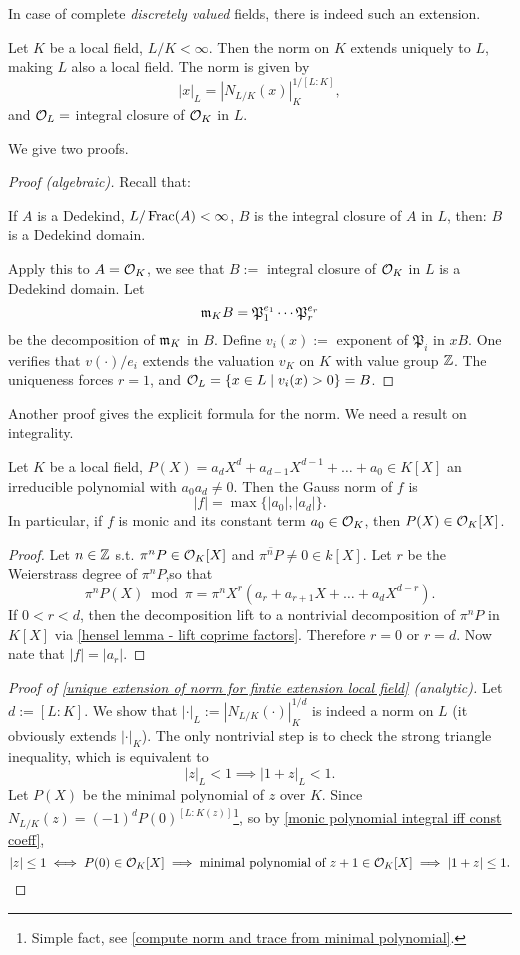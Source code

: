 In case of complete \textit{discretely valued} fields, there is indeed such an extension.
\begin{theorem}\label{unique extension of norm for fintie extension local field}
    Let $K$ be a local field, $L/K < \infty$.
    Then the norm on $K$ extends uniquely to $L$, making $L$ also a local field.
    The norm is given by \[|x|_L = \left|N_{L/K}(x)\right|_K^{1/[L : K]},\]
    and $\mathcal{O}_L = $ integral closure of $\mathcal{O}_K$ in $L$. 
\end{theorem}
We give two proofs.
\begin{proof}
    [Proof (algebraic)]Recall that:
\begin{lemma}\label{extension of Dedekind: integral closure of Dedekind domain in finite extension of its fraction field is Dedekind domain}
    If $A$ is a Dedekind, $L/\operatorname{Frac}(A) < \infty$, $B$ is the integral closure of $A$ in $L$, then: $B$ is a Dedekind domain.
\end{lemma}
Apply this to $A = \mathcal{O}_K$,
we see that $B :=$ integral closure of $\mathcal{O}_K$ in $L$ is a Dedekind domain.
Let \[\mathfrak{m}_KB = \mathfrak{P}_1^{e_1}\cdots\mathfrak{P}_r^{e_r}\] be the decomposition of $\mathfrak{m}_K$ in $B$. Define $v_i(x) := $ exponent of $\mathfrak{P}_i$ in $xB$.
One verifies that $v(\cdot)/e_i$ extends the valuation $v_K$ on $K$ with value group $\mathbb{Z}$.
The uniqueness forces $r = 1$, and $\mathcal{O}_L = \{x\in L\mid v_i(x) > 0\} = B$.
\end{proof}
Another proof gives the explicit formula for the norm. We need a result on integrality.
\begin{proposition}
    Let $K$ be a local field, $P(X) = a_dX^d + a_{d-1}X^{d-1} + \dots + a_0\in K[X]$ an irreducible polynomial with $a_0a_d\ne 0$.
    Then the Gauss norm of $f$ is
    \[|f| = \max\{|a_0|, |a_d|\}.\]
    In particular, if $f$ is monic and its constant term $a_0\in\mathcal{O}_K$, then $P(X)\in\mathcal{O}_K[X]$.
\end{proposition}
\begin{proof}\label{monic polynomial integral iff const coeff}
    Let $n\in\mathbb{Z}$ s.t. $\pi^nP\in \mathcal{O}_K[X]$ and $\overline{\pi^nP}\ne 0\in k[X] $.
    Let $r$ be the Weierstrass degree of $\pi^nP$,so that \[\pi^nP(X)\bmod\pi = \pi^nX^r(a_r + a_{r+1}X + \dots + a_dX^{d-r}).\] 
    If $0 < r < d$,
    then the decomposition lift to a nontrivial decomposition of $\pi^nP$ in $K[X]$ via \cref{hensel lemma - lift coprime factors}.
    Therefore $r = 0$ or $r = d$.
    Now nate that $|f| = |a_r|$.
\end{proof}
\begin{proof}
    [Proof of \cref{unique extension of norm for fintie extension local field} (analytic)]
    Let $d := [L : K]$.
    We show that $|\cdot|_L := |N_{L/K}(\cdot)|_K^{1/d}$ is indeed a norm on $L$ (it obviously extends $|\cdot|_K$).
    The only nontrivial step is to check the strong triangle inequality, which is equivalent to \[|z|_L < 1\implies |1 + z|_L < 1.\]
    Let $P(X)$ be the minimal polynomial of $z$ over $K$.
    Since
    $N_{L/K}(z) = (-1)^{d} P(0)^{[L : K(z)]}$\footnote{Simple fact, see \cref{compute norm and trace from minimal polynomial}.},
    so by \cref{monic polynomial integral iff const coeff}, \[|z| \le 1\iff P(0)\in\mathcal{O}_K[X]\implies \text{minimal polynomial of }z+1\in \mathcal{O}_K[X]\implies |1 + z| \le 1.\qedhere\]
\end{proof}
